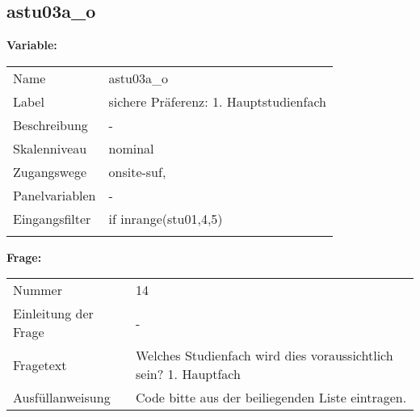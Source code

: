 	
	
	\subsection{astu03a\_o}
	\label{subSection:astu03a_o}

	\noindent\textbf{Variable:}\\
		\begin{tabular}{lL{11.3cm}}
			\label{tableVariable:astu03a_o}
			Name & astu03a\_o \\
			Label & sichere Präferenz: 1. Hauptstudienfach  \\
			Beschreibung & - \\
			Skalenniveau & nominal \\
			Zugangswege &
				onsite-suf,
 \\
			Panelvariablen & -
			 \\
			Eingangsfilter & if inrange(stu01,4,5) \\
 \\
		\end{tabular}

		\vspace*{1 cm}
		\noindent\textbf{Frage:}\\
		\begin{tabular}{lL{11.3cm}}
			\label{tableQuestion:astu03a_o}
			Nummer & 14 \\
			Einleitung der Frage & - \\
			Fragetext & Welches Studienfach wird dies voraussichtlich sein?
1. Hauptfach \\
			Ausfüllanweisung & Code bitte aus der beiliegenden Liste eintragen. \\
		\end{tabular}






